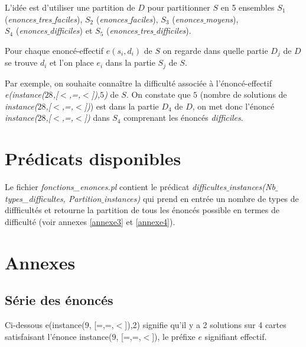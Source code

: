 \documentclass[a4paper, 12]{article}
\begin{document}
L'idée est d'utiliser une partition de $D$ pour partitionner $S$ en 5 ensembles $S_1$ (\emph{enonces$\_$tres$\_$faciles}), $S_2$ (\emph{enonces$\_$faciles}), $S_3$ (\emph{enonces$\_$moyens}),\\  $S_4$ (\emph{enonces$\_$difficiles}) et 
$S_5$ (\emph{enonces$\_$tres$\_$difficiles}).

Pour chaque enoncé-effectif $e(s_i, d_i)$ de $S$ on regarde dans quelle partie $D_j$ de $D$ se trouve $d_i$ et l'on place $e_i$ dans la partie $S_j$ de $S$. 

Par exemple, on souhaite connaître la difficulté associée à l'énoncé-effectif \emph{e(instance($28$,[$<$,=,$<$]),$5$)} de $S$. On constate que $5$ (nombre de solutions de \emph{instance($28$,[$<$,=,$<$])}) est dans la partie $D_4$ de $D$, on met donc l'énoncé
\\ \emph{instance($28$,[$<$,=,$<$])} dans $S_4$ comprenant les énoncés \emph{difficiles}.


\section{Prédicats disponibles}

Le fichier \emph{fonctions\_enonces.pl} contient le prédicat \emph{difficultes$\_$instances(Nb$\_$types\_difficultes, Partition$\_$instances)} qui prend en entrée un nombre de types de diffficultés et retourne la partition de tous les énoncés possible en termes de difficulté (voir annexes \ref{annexe3} et \ref{annexe4}).

\section{Annexes}

\subsection{Série des énoncés}

\label{annexe1}

Ci-dessous e(instance($9$, [=,=,$<$]),2) signifie qu’il y a 2 solutions sur 4 cartes satisfaisant l’énonce instance($9$, [=,=,$<$]), le préfixe $e$ signifiant effectif.
\end{document}
